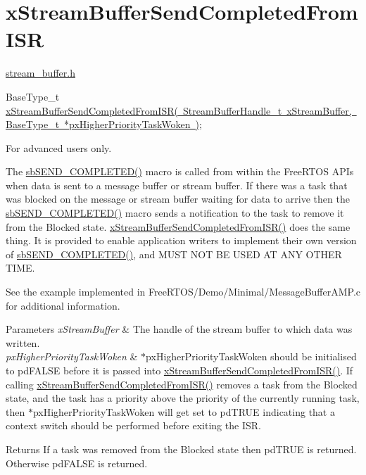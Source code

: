 \hypertarget{group__x_stream_buffer_send_completed_from_i_s_r}{}\section{x\+Stream\+Buffer\+Send\+Completed\+From\+I\+SR}
\label{group__x_stream_buffer_send_completed_from_i_s_r}
\mbox{\hyperlink{stream__buffer_8h}{stream\+\_\+buffer.\+h}}


\begin{DoxyPre}
BaseType\_t \mbox{\hyperlink{stream__buffer_8h_abc37189e4eb8618f5434ae333dd50b23}{xStreamBufferSendCompletedFromISR( StreamBufferHandle\_t xStreamBuffer, BaseType\_t *pxHigherPriorityTaskWoken )}};
\end{DoxyPre}


For advanced users only.

The \mbox{\hyperlink{stream__buffer_8c_aa75273dfbcd92710254df0165ae1da5d}{sb\+S\+E\+N\+D\+\_\+\+C\+O\+M\+P\+L\+E\+T\+E\+D()}} macro is called from within the Free\+R\+T\+OS A\+P\+Is when data is sent to a message buffer or stream buffer. If there was a task that was blocked on the message or stream buffer waiting for data to arrive then the \mbox{\hyperlink{stream__buffer_8c_aa75273dfbcd92710254df0165ae1da5d}{sb\+S\+E\+N\+D\+\_\+\+C\+O\+M\+P\+L\+E\+T\+E\+D()}} macro sends a notification to the task to remove it from the Blocked state. \mbox{\hyperlink{stream__buffer_8h_abc37189e4eb8618f5434ae333dd50b23}{x\+Stream\+Buffer\+Send\+Completed\+From\+I\+S\+R()}} does the same thing. It is provided to enable application writers to implement their own version of \mbox{\hyperlink{stream__buffer_8c_aa75273dfbcd92710254df0165ae1da5d}{sb\+S\+E\+N\+D\+\_\+\+C\+O\+M\+P\+L\+E\+T\+E\+D()}}, and M\+U\+ST N\+OT BE U\+S\+ED AT A\+NY O\+T\+H\+ER T\+I\+ME.

See the example implemented in Free\+R\+T\+O\+S/\+Demo/\+Minimal/\+Message\+Buffer\+A\+M\+P.\+c for additional information.


\begin{DoxyParams}{Parameters}
{\em x\+Stream\+Buffer} & The handle of the stream buffer to which data was written.\\
\hline
{\em px\+Higher\+Priority\+Task\+Woken} & $\ast$px\+Higher\+Priority\+Task\+Woken should be initialised to pd\+F\+A\+L\+SE before it is passed into \mbox{\hyperlink{stream__buffer_8h_abc37189e4eb8618f5434ae333dd50b23}{x\+Stream\+Buffer\+Send\+Completed\+From\+I\+S\+R()}}. If calling \mbox{\hyperlink{stream__buffer_8h_abc37189e4eb8618f5434ae333dd50b23}{x\+Stream\+Buffer\+Send\+Completed\+From\+I\+S\+R()}} removes a task from the Blocked state, and the task has a priority above the priority of the currently running task, then $\ast$px\+Higher\+Priority\+Task\+Woken will get set to pd\+T\+R\+UE indicating that a context switch should be performed before exiting the I\+SR.\\
\hline
\end{DoxyParams}
\begin{DoxyReturn}{Returns}
If a task was removed from the Blocked state then pd\+T\+R\+UE is returned. Otherwise pd\+F\+A\+L\+SE is returned. 
\end{DoxyReturn}

